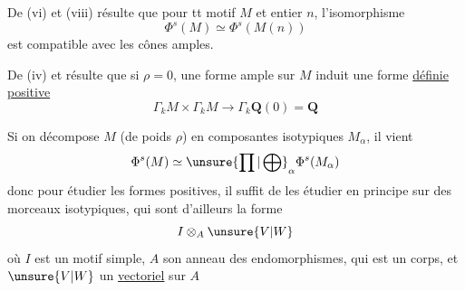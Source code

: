 De (vi) et (viii) résulte que pour tt
motif $M$ et entier $n$, l'isomorphisme
\[
\Phi^s(M)\simeq\Phi^s(M(n))
\]
est compatible avec les cônes amples.

De (iv) et  résulte que si $\rho=0$, une
forme ample sur $M$ induit une
forme \uline{définie positive}
\[
\Gamma_k M\times\Gamma_k M\longrightarrow\Gamma_k\mathbf Q(0)=\mathbf Q
\]

Si on décompose $M$ (de poids $\rho$) en
composantes isotypiques $M_\alpha$, il vient
\[
\Phi^s(M)\simeq\unsure{\prod|\bigoplus}_\alpha\Phi^s(M_\alpha)
\]
donc pour étudier les formes positives, il
suffit de les étudier en principe sur
des morceaux isotypiques, qui sont
d'ailleurs  la forme
\[
I\otimes_A\unsure{V|W}
\]
où $I$ est un motif simple, $A$ son
anneau des endomorphismes, qui est
un corps, et $\unsure{V|W}$ un \uline{vectoriel} sur $A$
